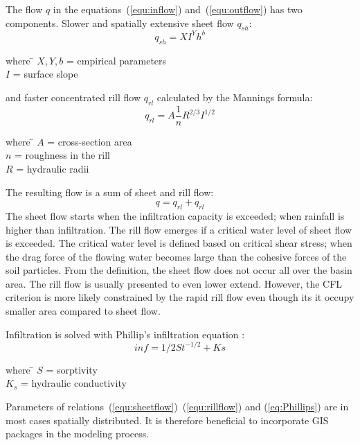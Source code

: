 The flow $q$ in the equations~(\ref{equ:inflow}) and~(\ref{equ:outflow})
has two components. Slower and spatially extensive sheet flow
$q_{sh}$:
\begin{equation}\label{equ:sheetflow}
    q_{sh} = XI^Yh^b
\end{equation}
\begin{tabbing} 
where \hspace{0.6cm} \= $X,Y,b$ = empirical parameters\\
\> $I$ = surface slope
\end{tabbing}
and faster concentrated rill flow $q_{rl}$ calculated by the Mannings formula:
\begin{equation}\label{equ:rillflow}
    q_{rl} = A\frac{1}{n} R^{2/3} I^{1/2}
\end{equation}
\begin{tabbing} 
where \hspace{0.6cm} \= $A$ = cross-section area\\
\> $n$ = roughness in the rill\\
\> $R$ = hydraulic radii
\end{tabbing}
The resulting flow is a sum of sheet and rill flow:
\begin{equation}\label{equ:flow}
    q = q_{rl} + q_{rl}
\end{equation}
The sheet flow starts when the infiltration capacity is exceeded; 
when rainfall is higher than infiltration. The rill flow emerges if 
a critical water level of sheet flow is exceeded. The critical 
water level is defined based on critical shear stress; when the 
drag force of the flowing water becomes large than the cohesive 
forces of the soil particles.
From the definition, the sheet flow does not occur all over the 
basin area. The rill flow is usually presented to even lower extend. 
However, the CFL criterion is more likely constrained by the 
rapid rill flow even though its it occupy smaller area compared to sheet flow. 

Infiltration is solved with Phillip's infiltration equation \cite{philip1957theory}:
\begin{equation}\label{eq:Phillips}
    inf = 1/2St^{-1/2} + Ks
\end{equation}
\begin{tabbing} 
where \hspace{0.6cm} \= $S$ = sorptivity\\
\> $K_s$ = hydraulic conductivity
\end{tabbing}

Parameters of relations~(\ref{equ:sheetflow})~(\ref{equ:rillflow}) and
(\ref{eq:Phillips}) are in most cases spatially distributed. It is 
therefore beneficial to incorporate GIS packages in the modeling process. 



